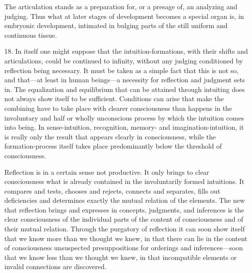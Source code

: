 \documentclass[12pt,a4paper]{book}
\newcommand{\opage}[1]{\marginnote{\footnotesize\textit{[#1]}}}
\begin{document}
The articulation stands as a preparation for, or a presage of, an
analyzing and judging. Thus what at later stages of development becomes a
special organ is, in embryonic development, intimated in bulging parts of
the still uniform and continuous tissue.

18. In itself one might suppose that the intuition-formations, with their
shifts and articulations, could be continued to infinity, without any
judging conditioned by reflection being necessary. It must be taken as a
simple fact that this is not so, and that---at least in human beings---a
necessity for reflection and judgment sets in. The equalization and
equilibrium that can be attained through intuiting does not always show
itself to be sufficient. Conditions can arise that make the combining have
to take place with clearer consciousness than happens in the involuntary
and half or wholly unconscious process by which the intuition comes into
being. In sense-intuition, recognition, memory- and imagination-intuition,
it is really only the result that appears clearly in consciousness, while
the formation-process itself takes place predominantly below the threshold
of consciousness.

Reflection is in a certain sense not productive. It only brings to clear
consciousness what is already contained in the involuntarily formed
intuitions. It compares and tests, chooses and rejects, connects and
separates, fills out deficiencies and determines exactly the mutual
relation of the elements. The new that reflection brings and expresses in
concepts, judgments, and inferences is the clear consciousness of the
individual parts of the content of consciousness and of their \opage{57}mutual
relation. Through the purgatory of reflection it can soon show itself that
we know more than we thought we knew, in that there can lie in the content
of consciousness unsuspected presuppositions for orderings and
inferences---soon that we know less than we thought we knew, in that
incompatible elements or invalid connections are discovered.
\end{document}
